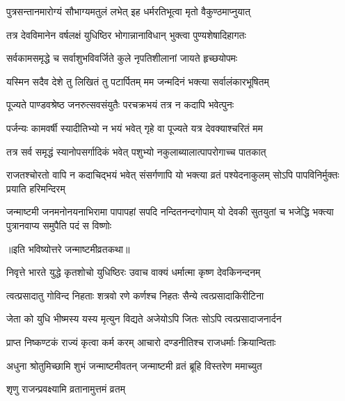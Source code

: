 \twolineshloka
{पुत्रसन्तानमारोग्यं सौभाग्यमतुलं लभेत्}
{इह धर्मरतिभूत्वा मृतो वैकुण्ठमाप्नुयात्}%


\twolineshloka
{तत्र देवविमानेन वर्षलक्षं युधिष्ठिर}
{भोगान्नानाविधान् भुक्त्वा पुण्यशेषादिहागतः}%


\twolineshloka
{सर्वकामसमृद्धे च सर्वाशुभविवर्जिते}
{कुले नृपतिशीलानां जायते हृच्छयोपमः}%


\twolineshloka
{यस्मिन सदैव देशे तु लिखितं तु पटार्पितम्}
{मम जन्मदिनं भक्त्या सर्वालंकारभूषितम्}%


\twolineshloka
{पूज्यते पाण्डवश्रेष्ठ जनरुत्सवसंयुतैः}
{परचक्रभयं तत्र न कदापि भवेत्पुनः}%


\twolineshloka
{पर्जन्यः कामवर्षी स्यादीतिभ्यो न भयं भवेत्}
{गृहे वा पूज्यते यत्र देवक्याश्चरितं मम}%


\twolineshloka
{तत्र सर्व समृद्धं स्यानोपसर्गादिकं भवेत्}
{पशुभ्यो नकुलाब्यालात्पापरोगाच्च पातकात्}%

\threelineshloka
{राजतश्चोरतो वापि न कदाचिद्भयं भवेत्}
{संसर्गणापि यो भक्त्या व्रतं पश्येदनाकुलम्}
{सोऽपि पापविनिर्मुक्तः प्रयाति हरिमन्दिरम्}%

\fourlineindentedshloka
{जन्माष्टमी जनमनोनयनाभिरामा}
{पापापहां सपदि नन्दितनन्दगोपाम्}
{यो देवकी सुतयुतां च भजेद्धि भक्त्या}
{पुत्रानवाप्य समुपैति पदं स विष्णोः}%

॥इति भविष्योत्तरे जन्माष्टमीव्रतकथा॥






\twolineshloka
{निवृत्ते भारते युद्धे कृतशोचो युधिष्ठिरः}
{उवाच वाक्यं धर्मात्मा कृष्ण देवकिनन्दनम्}%

\twolineshloka
{त्वत्प्रसादातु गोविन्द निहताः शत्रवो रणे}
{कर्णश्च निहतः सैन्ये त्वत्प्रसादाकिरीटिना}%

\twolineshloka
{जेता को युधि भीष्मस्य यस्य मृत्युन विद्यते}
{अजेयोऽपि जितः सोऽपि त्वत्प्रसादाजनार्दन}%

\twolineshloka
{प्राप्त निष्कण्टकं राज्यं कृत्वा कर्म करम्}
{आचारो दण्डनीतिश्च राजधर्माः क्रियान्विताः}%

\twolineshloka
{अधुना श्रोतुमिच्छामि शुभं जन्माष्टमीवतन्}
{जन्माष्टमी व्रतं ब्रूहि विस्तरेण ममाच्युत}%

\onelineshloka
{शृणु राजन्प्रवक्ष्यामि व्रतानामुत्तमं व्रतम्}%

